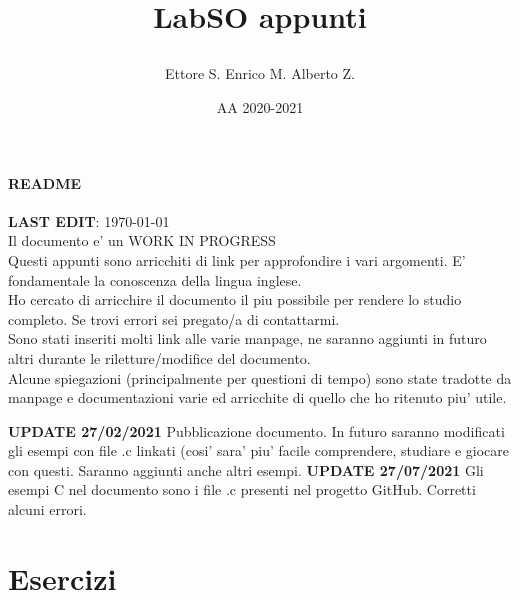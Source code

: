 \documentclass[a4paper]{article}
\title{\huge LabSO appunti\par}
\author{Ettore S.  Enrico M.  Alberto Z.\\

}
\date{AA 2020-2021}
\begin{document}
\lstset{style=C_code}
\maketitle
\clearpage


\paragraph{README} 
\textbf{LAST EDIT}: \today
\\
Il documento e' un WORK IN PROGRESS
\\
Questi appunti sono arricchiti di link per approfondire i vari argomenti. E' fondamentale la conoscenza della lingua inglese.\\
Ho cercato di arricchire il documento il piu possibile per rendere lo studio completo. Se trovi errori sei pregato/a di contattarmi. \\
Sono stati inseriti molti link alle varie manpage, ne saranno aggiunti in futuro altri durante le riletture/modifice del documento. \\
Alcune spiegazioni (principalmente per questioni di tempo) sono state tradotte da manpage e documentazioni varie ed arricchite di quello che ho ritenuto piu' utile.\\\break{}

\textbf{UPDATE 27/02/2021} Pubblicazione documento. In futuro saranno modificati gli esempi con file .c linkati (cosi' sara' piu' facile comprendere, studiare e giocare con questi. Saranno aggiunti anche altri esempi.\break{}
\textbf{UPDATE 27/07/2021} Gli esempi C nel documento sono i file .c presenti nel progetto GitHub. Corretti alcuni errori. 

\clearpage
\tableofcontents
\clearpage
{}

\clearpage

\clearpage

\clearpage

\clearpage



\clearpage
\section{Esercizi}
\end{document}
